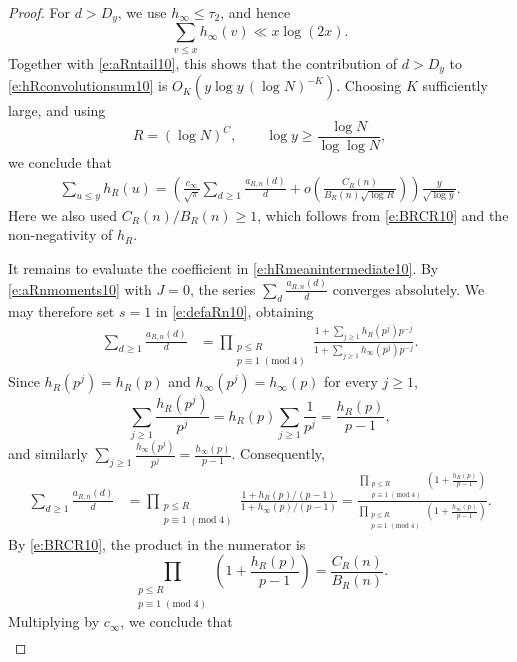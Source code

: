 \documentclass[12pt,reqno]{amsart}
\numberwithin{equation}{section}
\theoremstyle{definition}
\theoremstyle{remark}
\begin{document}
\begin{proof}
For \(d>D_y\), we use \(h_\infty\leq\tau_2\), and hence
\[
 \sum_{v\leq x}h_\infty(v)\ll x\log(2x).
\]
Together with \eqref{e:aRntail10}, this shows that the contribution of
\(d>D_y\) to \eqref{e:hRconvolutionsum10} is $O_K(y\log y\,(\log N)^{-K})$.
Choosing \(K\) sufficiently large, and using
\[
 R=(\log N)^C,\qquad
 \log y\geq\frac{\log N}{\log\log N},
\]
we conclude that
\begin{align}\label{e:hRmeanintermediate10}
 \sum_{u\leq y}h_R(u)
 =
 \left(
 \frac{c_\infty}{\sqrt\pi}
 \sum_{d\geq1}\frac{a_{R,n}(d)}d
 +o\left(
 \frac{C_R(n)}{B_R(n)\sqrt{\log R}}
 \right)
 \right)
 \frac{y}{\sqrt{\log y}}.
\end{align}
Here we also used \(C_R(n)/B_R(n)\geq1\), which follows from
\eqref{e:BRCR10} and the non-negativity of \(h_R\).

It remains to evaluate the coefficient in
\eqref{e:hRmeanintermediate10}.  By
\eqref{e:aRnmoments10} with \(J=0\), the series $ \sum_d\frac{a_{R,n}(d)}d$
converges absolutely.  We may therefore set \(s=1\) in
\eqref{e:defaRn10}, obtaining
\begin{align*}
 \sum_{d\geq1}\frac{a_{R,n}(d)}d
 &=
 \prod_{\substack{p\leq R\\p\equiv1\;(\mathrm{mod}\;4)}}
 \frac{
  1+\displaystyle\sum_{j\geq1}h_R(p^j)p^{-j}
 }{
  1+\displaystyle\sum_{j\geq1}h_\infty(p^j)p^{-j}
 }.
\end{align*}
Since \(h_R(p^j)=h_R(p)\) and
\(h_\infty(p^j)=h_\infty(p)\) for every \(j\geq1\),
\[
 \sum_{j\geq1}\frac{h_R(p^j)}{p^j}
 =
 h_R(p)\sum_{j\geq1}\frac1{p^j}
 =
 \frac{h_R(p)}{p-1},
\]
and similarly $ \sum_{j\geq1}\frac{h_\infty(p^j)}{p^j}
 =
 \frac{h_\infty(p)}{p-1}.$
Consequently,
\begin{align*}
 \sum_{d\geq1}\frac{a_{R,n}(d)}d
 &=
 \prod_{\substack{p\leq R\\p\equiv1\;(\mathrm{mod}\;4)}}
 \frac{1+h_R(p)/(p-1)}
      {1+h_\infty(p)/(p-1)}=
 \frac{
 \displaystyle
 \prod_{\substack{p\leq R\\p\equiv1\;(\mathrm{mod}\;4)}}
 \left(1+\frac{h_R(p)}{p-1}\right)}
 {\displaystyle
 \prod_{\substack{p\leq R\\p\equiv1\;(\mathrm{mod}\;4)}}
 \left(1+\frac{h_\infty(p)}{p-1}\right)}.
\end{align*}
By \eqref{e:BRCR10}, the product in the numerator is
\[
 \prod_{\substack{p\leq R\\p\equiv1\;(\mathrm{mod}\;4)}}
 \left(1+\frac{h_R(p)}{p-1}\right)
 =
 \frac{C_R(n)}{B_R(n)}.
\]
Multiplying by \(c_\infty\), we conclude that
\begin{align}\label{e:aRncoefficient10}

\end{align}
\end{proof}
\end{document}
